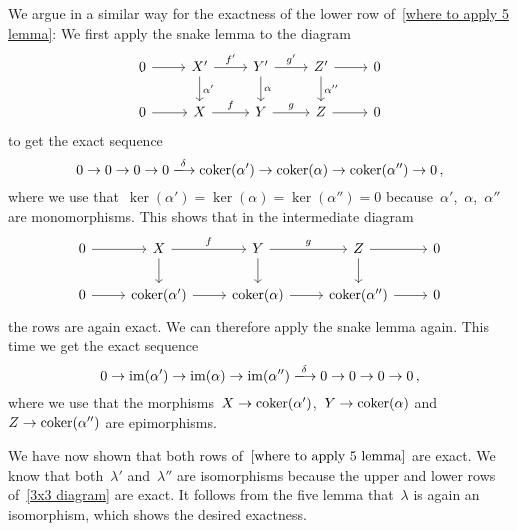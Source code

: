 We argue in a similar way for the exactness of the lower row of~\eqref{where to apply 5 lemma}:
We first apply the snake lemma to the diagram
\[
  \begin{tikzcd}
      0
      \arrow{r}
    & X'
      \arrow{r}[above]{f'}
      \arrow{d}[right]{\alpha'}
    & Y'
      \arrow{r}[above]{g'}
      \arrow{d}[right]{\alpha}
    & Z'
      \arrow{r}
      \arrow{d}[right]{\alpha''}
    & 0
    \\
      0
      \arrow{r}
    & X
      \arrow{r}[above]{f}
    & Y
      \arrow{r}[above]{g}
    & Z
      \arrow{r}
    & 0
  \end{tikzcd}
\]
to get the exact sequence
\[
  0
  \to
  0
  \to
  0
  \to
  0
  \xlongto{\delta}
  \coker(\alpha')
  \to
  \coker(\alpha)
  \to
  \coker(\alpha'')
  \to
  0 \,,
\]
where we use that~$\ker(\alpha') = \ker(\alpha) = \ker(\alpha'') = 0$ because~$\alpha'$,~$\alpha$,~$\alpha''$ are monomorphisms.
This shows that in the intermediate diagram
\[
  \begin{tikzcd}
      0
      \arrow{r}
    & X
      \arrow{r}[above]{f}
      \arrow{d}
    & Y
      \arrow{r}[above]{g}
      \arrow{d}
    & Z
      \arrow{r}
      \arrow{d}
    & 0
    \\
      0
      \arrow{r}
    & \coker(\alpha')
      \arrow{r}
    & \coker(\alpha)
      \arrow{r}
    & \coker(\alpha'')
      \arrow{r}
    & 0
  \end{tikzcd}
\]
the rows are again exact.
We can therefore apply the snake lemma again.
This time we get the exact sequence
\[
  0
  \to
  \im(\alpha')
  \to
  \im(\alpha)
  \to
  \im(\alpha'')
  \xlongto{\delta}
  0
  \to
  0
  \to
  0
  \to
  0 \,,
\]
where we use that the morphisms~$X \to \operatorname{coker}(\alpha')$,~$Y \to \operatorname{coker}(\alpha)$ and~$Z \to \operatorname{coker}(\alpha'')$ are epimorphisms.

We have now shown that both rows of~$\eqref{where to apply 5 lemma}$ are exact.
We know that both~$\lambda'$ and~$\lambda''$ are isomorphisms because the upper and lower rows of~\eqref{3x3 diagram} are exact.
It follows from the five lemma that~$\lambda$ is again an isomorphism, which shows the desired exactness.









